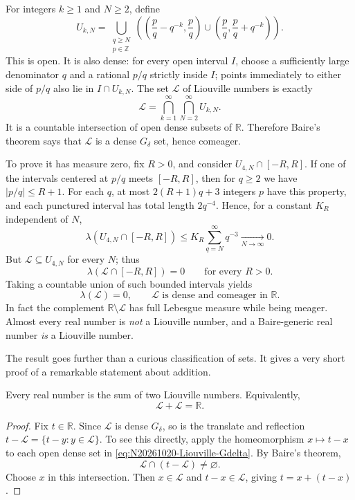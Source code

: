 For integers \(k\ge1\) and \(N\ge2\), define
\begin{equation}
 U_{k,N}
 =\bigcup_{\substack{q\ge N\\p\in\mathbb Z}}
 \left(
 \left(\frac pq-q^{-k},\frac pq\right)
 \cup
 \left(\frac pq,\frac pq+q^{-k}\right)
 \right).
 \label{eq:N20261020-Ukn}
\end{equation}
This is open. It is also dense: for every open interval \(I\), choose a sufficiently large denominator \(q\) and a rational \(p/q\) strictly inside \(I\); points immediately to either side of \(p/q\) also lie in \(I\cap U_{k,N}\). The set \(\mathcal L\) of Liouville numbers is exactly
\begin{equation}
 \mathcal L
 =\bigcap_{k=1}^\infty\bigcap_{N=2}^\infty U_{k,N}.
 \label{eq:N20261020-Liouville-Gdelta}
\end{equation}
It is a countable intersection of open dense subsets of \(\mathbb R\). Therefore Baire's theorem says that \(\mathcal L\) is a dense \(G_\delta\) set, hence comeager.

To prove it has measure zero, fix \(R>0\), and consider \(U_{4,N}\cap[-R,R]\). If one of the intervals centered at \(p/q\) meets \([-R,R]\), then for \(q\ge2\) we have \(|p/q|\le R+1\). For each \(q\), at most \(2(R+1)q+3\) integers \(p\) have this property, and each punctured interval has total length \(2q^{-4}\). Hence, for a constant \(K_R\) independent of \(N\),
\[
 \lambda(U_{4,N}\cap[-R,R])
 \le K_R\sum_{q=N}^\infty q^{-3}
 \xrightarrow[N\to\infty]{}0.
\]
But \(\mathcal L\subseteq U_{4,N}\) for every \(N\); thus
\[
 \lambda(\mathcal L\cap[-R,R])=0
 \qquad\text{for every }R>0.
\]
Taking a countable union of such bounded intervals yields
\begin{equation}
 \boxed{\lambda(\mathcal L)=0,\qquad
        \mathcal L\text{ is dense and comeager in }\mathbb R.}
 \label{eq:N20261020-Liouville-contrast}
\end{equation}
In fact the complement \(\mathbb R\setminus\mathcal L\) has full Lebesgue measure while being meager. Almost every real number is \emph{not} a Liouville number, and a Baire-generic real number \emph{is} a Liouville number.

The result goes further than a curious classification of sets. It gives a very short proof of a remarkable statement about addition.

\begin{proposition}
Every real number is the sum of two Liouville numbers. Equivalently,
\[
 \mathcal L+\mathcal L=\mathbb R.
\]
\end{proposition}
\begin{proof}
Fix \(t\in\mathbb R\). Since \(\mathcal L\) is dense \(G_\delta\), so is the translate and reflection \(t-\mathcal L=\{t-y:y\in\mathcal L\}\). To see this directly, apply the homeomorphism \(x\mapsto t-x\) to each open dense set in \eqref{eq:N20261020-Liouville-Gdelta}. By Baire's theorem,
\[
 \mathcal L\cap(t-\mathcal L)\ne\varnothing.
\]
Choose \(x\) in this intersection. Then \(x\in\mathcal L\) and \(t-x\in\mathcal L\), giving \(t=x+(t-x)\).
\end{proof}

